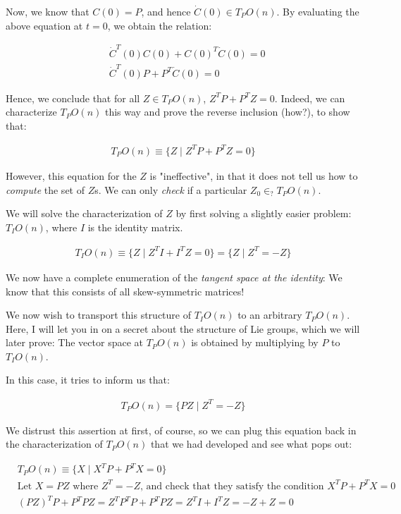 \documentclass[11pt]{book}
\begin{document}
Now, we know that $C(0) = P$, and hence $\dot C(0) \in T_P O(n)$. By evaluating
the above equation at $t = 0$, we obtain the relation:

\begin{align*}
&\dot C^T(0) C(0) + C(0)^T \dot C(0) = 0 \\
&\dot C^T(0) P + P^T \dot C(0) = 0
\end{align*}

Hence, we conclude that for all $Z \in T_P O(n)$, $Z^T P + P^T Z = 0$. Indeed,
we can characterize $T_P O(n)$ this way and prove the reverse inclusion (how?),
to show that:

\begin{align*}
     T_P O(n) \equiv \{ Z \mid Z^T P + P^T Z = 0 \}
\end{align*}

However, this equation for the $Z$ is "ineffective", in that it does not tell
us how to \textit{compute} the set of $Z$s. We can only \textit{check} if a
particular $Z_0 \in_? T_P O(n)$. 

We will solve the characterization of $Z$ by first solving a slightly easier
problem: $T_I O(n)$, where $I$ is the identity matrix. 

\begin{align*}
    T_I O(n) \equiv \{ Z \mid Z^T I + I^T Z = 0 \} = \{ Z \mid Z^T = -Z \}
 \end{align*}

 We now have a complete enumeration of the \textit{tangent space at the
 identity}: We know that this consists of all skew-symmetric matrices! 

 We now wish to transport this structure of $T_I O(n)$ to an arbitrary
 $T_P O(n)$.  Here, I will let you in on a secret about the structure of
 Lie groups, which we will later prove: The vector space at $T_P O(n)$ is obtained
 by multiplying by $P$ to $T_I O(n)$. 

 In this case, it tries to inform us that:

\begin{align*}
    T_P O(n) =  \{ PZ \mid Z^T = -Z \}
\end{align*}

We distrust this assertion at first, of course, so we can plug this equation back
in the characterization of $T_P O(n)$ that we had developed and see what pops out:

\begin{align*}
     &T_P O(n) \equiv \{ X \mid X^T P + P^T X = 0 \} \\
     &\text{Let $X = PZ$ where $Z^T = -Z$, and check that they satisfy the condition $X^T P + P^T X = 0$} \\
     & (PZ)^TP + P^TPZ = Z^TP^TP + P^TPZ = Z^T I + I^T Z = -Z + Z = 0
\end{align*}
\end{document}
